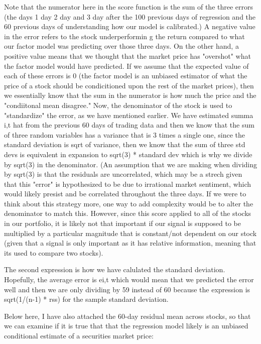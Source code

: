 \documentclass[12pt,letterpaper]{article}
\begin{document}
Note that the numerator here in the score function is the sum of the three errors (the days 1 day 2 day and 3 day after the 100 previous days of regression and the 60 previous days of understanding how our model is calibrated.) A negative value in the error refers to the stock underperformin g the return compared to what our factor model was predicting over those three days. On the other hand, a positive value means that we thought that the market price has "overshot" what the factor model would have predicted. If we assume that the expected value of each of these errors is 0 (the factor model is an unbiased estimator of what the price of a stock should be condicitioned upon the rest of the market prices), then we essentially know that the sum in the numerator is how much the price and the "condiitonal mean disagree." Now, the denominator of the stock is used to "standardize" the error, as we have mentioned earlier. We have estimated summa i,t hat from the previous 60 days of trading data and then we know that the sum of three random variables has a variance that is 3 times a single one, since the standard deviation is sqrt of variance, then we know that the sum of three std devs is equivalent in expansion to sqrt(3) * standard dev which is why we divide by sqrt(3) in the denominator.
(An assumption that we are making when dividing by sqrt(3) is that the residuals are uncorrelated, which may be a strech given that this "error" is hypothesized to be due to irrational market sentiment, which would likely presist and be correlated throughout the three days. If we were to think about this strategy more, one way to add complexity would be to alter the denominator to match this. However, since this score applied to all of the stocks in our portfolio, it is likely not that important if our signal is supposed to be multiplied by a particular magnitude that is constant/not dependent on our stock (given that a signal is only important as it has relative information, meaning that its used to compare two stocks). 

The second expression is how we have calulated the standard deviation. Hopefully, the average error is ei,t which would mean that we predicted the error well and then we are only dividing by 59 instead of 60 because the expression is sqrt(1/(n-1) * rss) for the sample standard deviation. 

Below here, I have also attached the 60-day residual mean across stocks, so that we can examine if it is true that that the regression model likely is an unbiased conditional estimate of a securities market price:  
\end{document}
